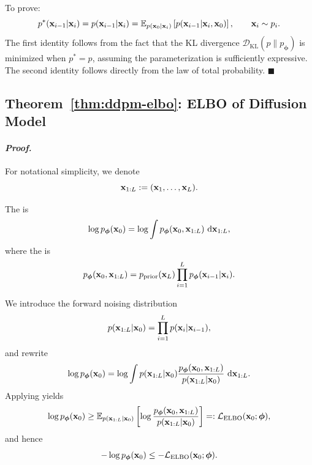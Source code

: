  To prove:
\[
p^*({\mathbf{x}}_{i-1}|{\mathbf{x}}_i)
=
p({\mathbf{x}}_{i-1}|{\mathbf{x}}_i)
=
\mathbb{E}_{p({\mathbf{x}}_0|{\mathbf{x}}_i)}
\left[
p({\mathbf{x}}_{i-1}|{\mathbf{x}}_i,{\mathbf{x}}_0)
\right],
\qquad
{\mathbf{x}}_i \sim p_i.
\]
The first identity follows from the fact that the KL divergence $\mathcal{D}_{\mathrm{KL}}(p \| p_{\bm{\phi}})$ is minimized when $p^* = p$, assuming the parameterization is sufficiently expressive. The second identity follows directly from the law of total probability.
\hfill$\blacksquare$



\subsection{Theorem~\ref{thm:ddpm-elbo}: ELBO of Diffusion Model}\label{app:vlb-proof}

\paragraph{\textit{Proof.}} For notational simplicity, we denote
\[
{\mathbf{x}}_{1:L}:=({\mathbf{x}}_1,\ldots,{\mathbf{x}}_L).
\]

The  is
\[
\log p_{\bm{\phi}}({\mathbf{x}}_0)
=
\log \int p_{\bm{\phi}}({\mathbf{x}}_0,{\mathbf{x}}_{1:L})\,\mathop{}\!\mathrm{d} {\mathbf{x}}_{1:L},
\]
where the  is
\[
p_{\bm{\phi}}({\mathbf{x}}_0,{\mathbf{x}}_{1:L})
=
p_{\text{prior}}({\mathbf{x}}_L)\prod_{i=1}^L p_{\bm{\phi}}({\mathbf{x}}_{i-1}| {\mathbf{x}}_i).
\]

We introduce the forward noising distribution 
\[
p({\mathbf{x}}_{1:L}| {\mathbf{x}}_0)
=
\prod_{i=1}^L p({\mathbf{x}}_i| {\mathbf{x}}_{i-1}),
\]
and rewrite
\[
\log p_{\bm{\phi}}({\mathbf{x}}_0)
=
\log \int
p({\mathbf{x}}_{1:L}| {\mathbf{x}}_0)
\frac{p_{\bm{\phi}}({\mathbf{x}}_0,{\mathbf{x}}_{1:L})}{p({\mathbf{x}}_{1:L}| {\mathbf{x}}_0)}
\,\mathop{}\!\mathrm{d} {\mathbf{x}}_{1:L}.
\]
Applying   yields
\[
\log p_{\bm{\phi}}({\mathbf{x}}_0)
\ge
\mathbb{E}_{p({\mathbf{x}}_{1:L}| {\mathbf{x}}_0)}
\left[
\log
\frac{p_{\bm{\phi}}({\mathbf{x}}_0,{\mathbf{x}}_{1:L})}{p({\mathbf{x}}_{1:L}| {\mathbf{x}}_0)}
\right]
=: \mathcal{L}_{\text{ELBO}}({\mathbf{x}}_0;\bm{\phi}),
\]
and hence
\[
-\log p_{\bm{\phi}}({\mathbf{x}}_0)
\le
-\mathcal{L}_{\text{ELBO}}({\mathbf{x}}_0;\bm{\phi}).
\]

